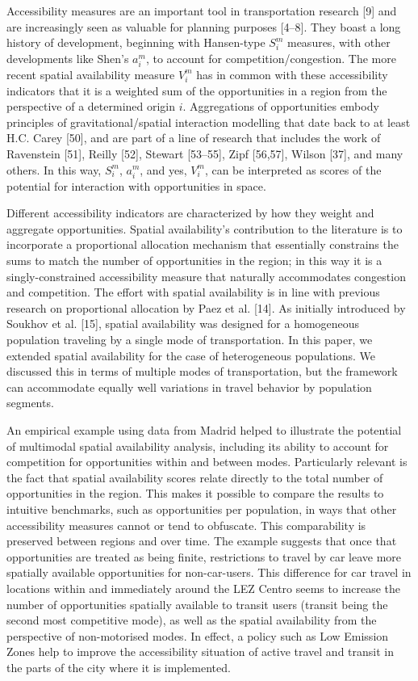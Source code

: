 \documentclass[10pt,letterpaper]{article}
\begin{document}
Accessibility measures are an important tool in transportation research
{[}9{]} and are increasingly seen as valuable for planning purposes
{[}4--8{]}. They boast a long history of development, beginning with
Hansen-type \(S_i^m\) measures, with other developments like Shen's
\(a_i^m\), to account for competition/congestion. The more recent
spatial availability measure \(V_i^m\) has in common with these
accessibility indicators that it is a weighted sum of the opportunities
in a region from the perspective of a determined origin \(i\).
Aggregations of opportunities embody principles of gravitational/spatial
interaction modelling that date back to at least H.C. Carey {[}50{]},
and are part of a line of research that includes the work of Ravenstein
{[}51{]}, Reilly {[}52{]}, Stewart {[}53--55{]}, Zipf {[}56,57{]},
Wilson {[}37{]}, and many others. In this way, \(S_i^m\), \(a_i^m\), and
yes, \(V_i^m\), can be interpreted as scores of the potential for
interaction with opportunities in space.

Different accessibility indicators are characterized by how they weight
and aggregate opportunities. Spatial availability's contribution to the
literature is to incorporate a proportional allocation mechanism that
essentially constrains the sums to match the number of opportunities in
the region; in this way it is a singly-constrained accessibility measure
that naturally accommodates congestion and competition. The effort with
spatial availability is in line with previous research on proportional
allocation by Paez et al. {[}14{]}. As initially introduced by Soukhov
et al. {[}15{]}, spatial availability was designed for a homogeneous
population traveling by a single mode of transportation. In this paper,
we extended spatial availability for the case of heterogeneous
populations. We discussed this in terms of multiple modes of
transportation, but the framework can accommodate equally well
variations in travel behavior by population segments.

An empirical example using data from Madrid helped to illustrate the
potential of multimodal spatial availability analysis, including its
ability to account for competition for opportunities within and between
modes. Particularly relevant is the fact that spatial availability
scores relate directly to the total number of opportunities in the
region. This makes it possible to compare the results to intuitive
benchmarks, such as opportunities per population, in ways that other
accessibility measures cannot or tend to obfuscate. This comparability
is preserved between regions and over time. The example suggests that
once that opportunities are treated as being finite, restrictions to
travel by car leave more spatially available opportunities for
non-car-users. This difference for car travel in locations within and
immediately around the LEZ Centro seems to increase the number of
opportunities spatially available to transit users (transit being the
second most competitive mode), as well as the spatial availability from
the perspective of non-motorised modes. In effect, a policy such as Low
Emission Zones help to improve the accessibility situation of active
travel and transit in the parts of the city where it is implemented.
\end{document}
